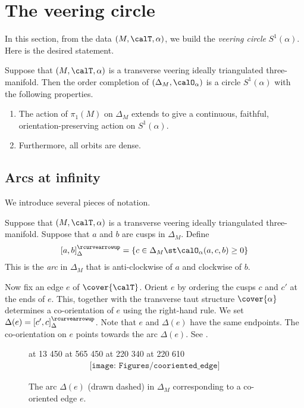 \documentclass[12pt]{amsart}
\newcommand{\acw}{\rcurvearrowup}
\begin{document}
\section{The veering circle}
\label{Sec:VeeringCircle}

In this section, from the data $(M, \calT, \alpha)$, we build the \emph{veering circle} $S^1(\alpha)$.  Here is the desired statement. 

\begin{theorem}
\label{Thm:VeeringCircle}
Suppose that $(M, \calT, \alpha)$ is a transverse veering ideally triangulated three-manifold.  Then the order completion of $(\Delta_M, \calO_\alpha)$ is a circle $S^1(\alpha)$ with the following properties.
\begin{enumerate}
\item 
\label{Itm:Acts}
The action of $\pi_1(M)$ on $\Delta_M$ extends to give a continuous, faithful, orientation-preserving action on  $S^1(\alpha)$.  
\item 
\label{Itm:Dense}
Furthermore, all orbits are dense.
\end{enumerate}
\end{theorem}

\subsection{Arcs at infinity}

We introduce several pieces of notation.  

\begin{definition}
\label{Def:Arcs}
Suppose that $(M, \calT, \alpha)$ is a transverse veering ideally triangulated three-manifold.  
Suppose that $a$ and $b$ are cusps in $\Delta_M$.  Define
\[
[a, b]_\Delta^\acw = \{ c \in \Delta_M \st \calO_\alpha(a, c, b) \geq 0 \}
\]
This is the \emph{arc} in $\Delta_M$ that is anti-clockwise of $a$ and clockwise of $b$. 

Now fix an edge $e$ of $\cover{\calT}$.  Orient $e$ by ordering the cusps $c$ and $c'$ at the ends of $e$.  This, together with the transverse taut structure $\cover{\alpha}$ determines a co-orientation of $e$ using the right-hand rule. 
We set $\Delta(e) = [c', c]_\Delta^\acw$.  Note that $e$ and $\Delta(e)$ have the same endpoints.   The co-orientation on $e$ points towards the arc $\Delta(e)$.  See .
\end{definition}

\begin{figure}[htbp]
\small\hair 2pt
 at 13 450 
 at 565 450 
 at 220 340 
 at 220 610
\endlabellist
\[
\begin{array}{c}
\texttt{[image: Figures/cooriented\_edge]}
\end{array}
\]
\caption{The arc $\Delta(e)$ (drawn dashed) in $\Delta_M$ corresponding to a co-oriented edge $e$.}
\label{Fig:CoorientedEdge}
\end{figure}
\end{document}
